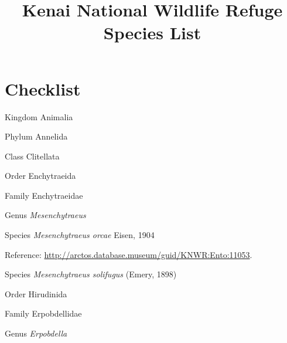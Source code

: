 \documentclass[9pt, article]{memoir}
\title{Kenai National Wildlife Refuge Species List}
\begin{document}
\maketitle

\chapter{Checklist}

\begin{multicols}{2}

\vspace{6pt}\noindent\hspace{0pt}Kingdom Animalia


\vspace{6pt}\noindent\hspace{6pt}Phylum Annelida


\vspace{6pt}\noindent\hspace{12pt}Class Clitellata


\vspace{6pt}\noindent\hspace{18pt}Order Enchytraeida


\vspace{6pt}\noindent\hspace{24pt}Family Enchytraeidae


\vspace{6pt}\noindent\hspace{30pt}Genus \textit{Mesenchytraeus}


\vspace{6pt}\noindent\hspace{36pt}Species \textit{Mesenchytraeus orcae} Eisen, 1904


Reference: 
\url{http://arctos.database.museum/guid/KNWR:Ento:11053}.

\vspace{6pt}\noindent\hspace{36pt}Species \textit{Mesenchytraeus solifugus} (Emery, 1898)


\vspace{6pt}\noindent\hspace{18pt}Order Hirudinida


\vspace{6pt}\noindent\hspace{24pt}Family Erpobdellidae


\vspace{6pt}\noindent\hspace{30pt}Genus \textit{Erpobdella}



\end{multicols}
\end{document}
